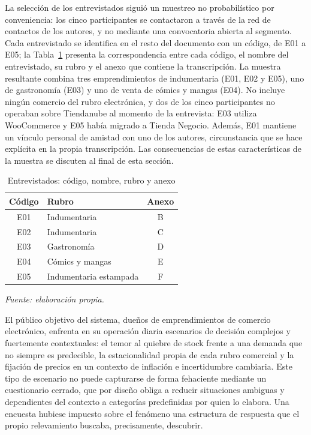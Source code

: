 La selección de los entrevistados siguió un muestreo no probabilístico por conveniencia: los cinco participantes se contactaron a través de la red de contactos de los autores, y no mediante una convocatoria abierta al segmento. Cada entrevistado se identifica en el resto del documento con un código, de E01 a E05; la Tabla~\ref{tab:entrevistados} presenta la correspondencia entre cada código, el nombre del entrevistado, su rubro y el anexo que contiene la transcripción. La muestra resultante combina tres emprendimientos de indumentaria (E01, E02 y E05), uno de gastronomía (E03) y uno de venta de cómics y mangas (E04). No incluye ningún comercio del rubro electrónica, y dos de los cinco participantes no operaban sobre Tiendanube al momento de la entrevista: E03 utiliza WooCommerce y E05 había migrado a Tienda Negocio. Además, E01 mantiene un vínculo personal de amistad con uno de los autores, circunstancia que se hace explícita en la propia transcripción. Las consecuencias de estas características de la muestra se discuten al final de esta sección.

\begin{table}[ht]
\centering
\caption{Entrevistados: código, nombre, rubro y anexo}
\label{tab:entrevistados}
\renewcommand{\arraystretch}{1.3}
\begin{tabular}{|c|l|c|}
\hline
\textbf{Código} & \textbf{Rubro} & \textbf{Anexo} \\
\hline
E01 & Indumentaria & B \\
\hline
E02 & Indumentaria & C \\
\hline
E03 & Gastronomía & D \\
\hline
E04 & Cómics y mangas & E \\
\hline
E05 & Indumentaria estampada & F \\
\hline
\end{tabular}

\smallskip
\noindent\textit{Fuente: elaboración propia.}
\end{table}

El público objetivo del sistema, dueños de emprendimientos de comercio electrónico, enfrenta en su operación diaria escenarios de decisión complejos y fuertemente contextuales: el temor al quiebre de stock frente a una demanda que no siempre es predecible, la estacionalidad propia de cada rubro comercial y la fijación de precios en un contexto de inflación e incertidumbre cambiaria. Este tipo de escenario no puede capturarse de forma fehaciente mediante un cuestionario cerrado, que por diseño obliga a reducir situaciones ambiguas y dependientes del contexto a categorías predefinidas por quien lo elabora. Una encuesta hubiese impuesto sobre el fenómeno una estructura de respuesta que el propio relevamiento buscaba, precisamente, descubrir.

